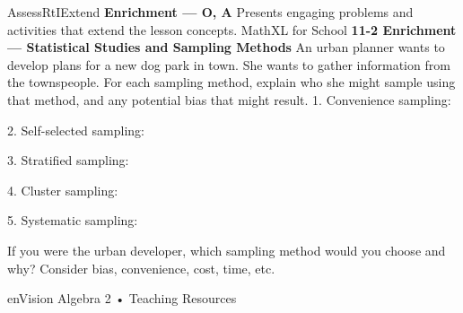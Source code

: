 \documentclass{article}
\newenvironment{te-addendum}[2]{}{}     %
\newcommand{\answer}[1]{}               %
\newcommand{\te}[1]{}                   %
\begin{document}
\begin{te-addendum}{Assess}{RtIExtend}
\textbf{Enrichment — O, A}
Presents engaging problems and activities that extend the lesson concepts.
MathXL for School
\textbf{11-2 Enrichment — Statistical Studies and Sampling Methods}
An urban planner wants to develop plans for a new dog park in town. She wants to gather information from the townspeople. For each sampling method, explain who she might sample using that method, and any potential bias that might result.
1. Convenience sampling:
\answer{Answers may vary. Sample: She surveys people as they enter the local pet store. This sample would be biased, since people entering a pet store are more likely to own a pet, which may be a dog. This sampling method is less likely to determine the needs of people who do not own dogs.}
2. Self-selected sampling:
\answer{Answers may vary. Sample: She posts ads asking people to come share their opinions at the next town meeting. The potential bias is that only people who are concerned about the park will attend the meeting.}
3. Stratified sampling:
\answer{Answers may vary. Sample: She groups people into two categories: dog owners and non-dog owners. Then she randomly selects 100 people from each group to answer a questionnaire. Since the selection is random and includes people from both groups, it is likely to be unbiased sampling.}
4. Cluster sampling:
\answer{Answers may vary. Sample: She divides the town into groups by neighborhood. Then she randomly chooses six neighborhoods and surveys all the residents in each neighborhood. Since the selection of neighborhoods is random, the results should be unbiased if the sample is large enough to represent the population.}
5. Systematic sampling:
\answer{Answers may vary. Sample: She selects every fourth house on a block to survey. Since the selection is random, the results should be unbiased, assuming the sample is large enough to represent the population.}
If you were the urban developer, which sampling method would you choose and why? Consider bias, convenience, cost, time, etc.
\answer{Answers may vary. Sample: Systematic sampling; the results are likely to be unbiased and it would require little time or money to determine who to include sample.}
\te{Printed who to include sample; likely who to include in the sample.}
enVision Algebra 2 • Teaching Resources
\end{te-addendum}
\end{document}
